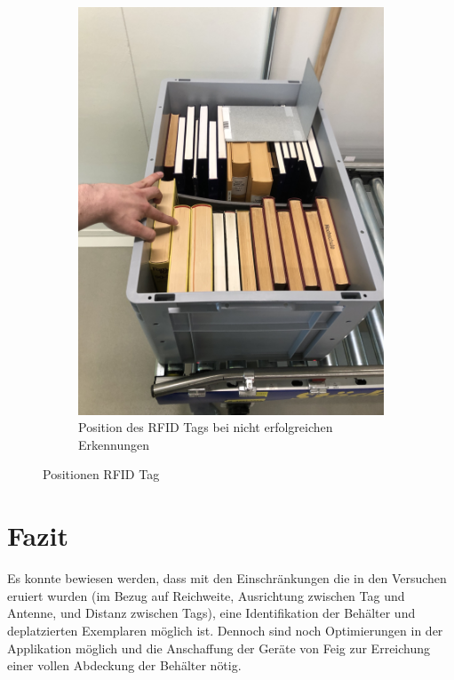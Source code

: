 \documentclass[parskip=full, a4paper]{scrartcl}
\begin{document}
\begin{figure}[htb]
\begin{subfigure}{0.48\linewidth}
		\includegraphics[keepaspectratio,width=\linewidth]{img/RFIDPositionNichtErfolgreich.jpg}
		\caption{Position des RFID Tags bei nicht erfolgreichen Erkennungen}
	\end{subfigure}
	\caption{Positionen RFID Tag}
	\label{fig:PositionenRFIDTag}
\end{figure}

\section{Fazit}
Es konnte bewiesen werden, dass mit den Einschränkungen die in den Versuchen eruiert wurden (im Bezug auf Reichweite, Ausrichtung zwischen Tag und Antenne, und Distanz zwischen Tags), eine Identifikation der Behälter und deplatzierten Exemplaren möglich ist. Dennoch sind noch Optimierungen in der Applikation möglich und die Anschaffung der Geräte von Feig zur Erreichung einer vollen Abdeckung der Behälter nötig.
\end{document}
